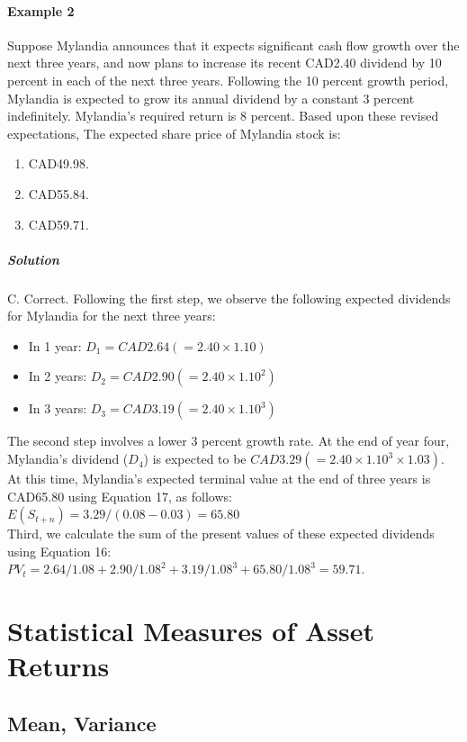 \paragraph{Example 2} %
Suppose Mylandia announces that it expects significant cash flow growth over the next three years, and now plans to increase its recent CAD2.40 dividend by 10 percent in each of the next three years. Following the 10 percent growth period, Mylandia is expected to grow its annual dividend by a constant 3 percent indefinitely. Mylandia’s required return is 8 percent. Based upon these revised expectations, The expected share price of Mylandia stock is:
\begin{enumerate}[label=\Alph*.]
	\item CAD49.98.
	\item CAD55.84.
	\item CAD59.71.
\end{enumerate}
\subparagraph{Solution} %
C. Correct. Following the first step, we observe the following expected dividends for Mylandia for the next three years:
\begin{itemize}
	\item In 1 year: $D_1 = CAD2.64 (=2.40 \times 1.10)$
	\item In 2 years: $D_2 = CAD2.90 (=2.40 \times 1.10^2)$
	\item In 3 years: $D_3 = CAD3.19 (=2.40 \times 1.10^3)$
\end{itemize}
The second step involves a lower 3 percent growth rate. At the end of year four, Mylandia's dividend ($D_4$) is expected to be $CAD3.29 (=2.40 \times 1.10^3 \times 1.03)$. At this time, Mylandia's expected terminal value at the end of three years is CAD65.80 using Equation 17, as follows:\\
$E(S_{t+n})= 3.29/(0.08- 0.03)=65.80$\\
Third, we calculate the sum of the present values of these expected dividends using Equation 16:\\
$PV_t= 2.64/1.08 + 2.90/1.08^2 + 3.19/1.08^3 + 65.80/1.08^3 = 59.71.$
\newpage
\section{Statistical Measures of Asset Returns}
\label{sec:Statistical Measures of Asset Returns}
\subsection{Mean, Variance} %
